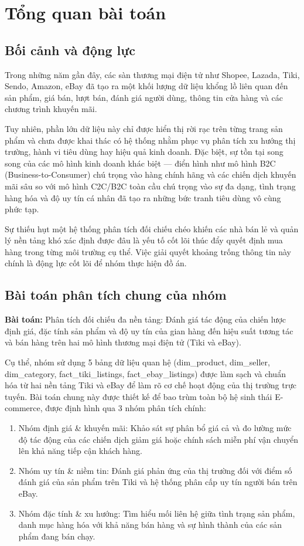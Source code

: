\section{Tổng quan bài toán}

\subsection{Bối cảnh và động lực}

Trong những năm gần đây, các sàn thương mại điện tử như Shopee, Lazada, Tiki, Sendo, Amazon, eBay đã tạo ra một khối lượng dữ liệu khổng lồ liên quan đến sản phẩm, giá bán, lượt bán, đánh giá người dùng, thông tin cửa hàng và các chương trình khuyến mãi.

Tuy nhiên, phần lớn dữ liệu này chỉ được hiển thị rời rạc trên từng trang sản phẩm và chưa được khai thác có hệ thống nhằm phục vụ phân tích xu hướng thị trường, hành vi tiêu dùng hay hiệu quả kinh doanh. Đặc biệt, sự tồn tại song song của các mô hình kinh doanh khác biệt — điển hình như mô hình B2C (Business-to-Consumer) chú trọng vào hàng chính hãng và các chiến dịch khuyến mãi sâu so với mô hình C2C/B2C toàn cầu chú trọng vào sự đa dạng, tình trạng hàng hóa và độ uy tín cá nhân đã tạo ra những bức tranh tiêu dùng vô cùng phức tạp.

Sự thiếu hụt một hệ thống phân tích đối chiếu chéo khiến các nhà bán lẻ và quản lý nền tảng khó  xác định được đâu là yếu tố cốt lõi thúc đẩy quyết định mua hàng trong từng môi trường cụ thể. Việc giải quyết khoảng trống thông tin này chính là động lực cốt lõi để nhóm thực hiện đồ án.

\subsection{Bài toán phân tích chung của nhóm}

\textbf{Bài toán:} Phân tích đối chiếu đa nền tảng: Đánh giá tác động của chiến lược định giá, đặc tính sản phẩm và độ uy tín của gian hàng đến hiệu suất tương tác và bán hàng trên hai mô hình thương mại điện tử (Tiki và eBay).

Cụ thể, nhóm sử dụng 5 bảng dữ liệu quan hệ (dim\_product, dim\_seller, dim\_category, fact\_tiki\_listings, fact\_ebay\_listings) được làm sạch và chuẩn hóa từ hai nền tảng Tiki và eBay để làm rõ cơ chế hoạt động của thị trường trực tuyến. Bài toán chung này được thiết kế để bao trùm toàn bộ hệ sinh thái E-commerce, được định hình qua 3 nhóm phân tích chính:

\begin{enumerate}
    \item Nhóm định giá \& khuyến mãi: Khảo sát sự phân bổ giá cả và đo lường mức độ tác động của các chiến dịch giảm giá hoặc chính sách miễn phí vận chuyển lên khả năng tiếp cận khách hàng.
    \item Nhóm uy tín \& niềm tin: Đánh giá phản ứng của thị trường đối với điểm số đánh giá của sản phẩm trên Tiki và hệ thống phân cấp uy tín người bán trên eBay.
    \item Nhóm đặc tính \& xu hướng: Tìm hiểu mối liên hệ giữa tình trạng sản phẩm, danh mục hàng hóa với khả năng bán hàng và sự hình thành của các sản phẩm đang bán chạy.
\end{enumerate}

